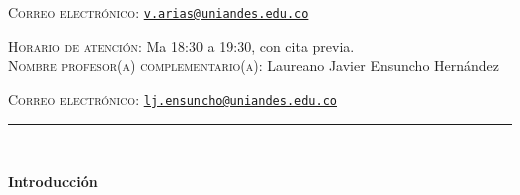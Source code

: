 \documentclass[letterpaper,10pt,onecolumn]{article}
\begin{document}
\noindent\textsc{Correo electr\'onico:}
\href{mailto:v.arias@uniandes.edu.co}{\nolinkurl{v.arias@uniandes.edu.co}}

\noindent\textsc{Horario de atenci\'on:} Ma 18:30 a 19:30, con cita previa. 
\\[-0.1cm]

\noindent\textsc{Nombre profesor(a) complementario(a):} 
Laureano Javier Ensuncho Hern\'andez

\noindent\textsc{Correo electr\'onico:}
\href{mailto: lj.ensuncho@uniandes.edu.co}{\nolinkurl{lj.ensuncho@uniandes.edu.co}}






\noindent\rule{\textwidth}{1pt}\\[-0.1cm]

\addtocounter{mysection}{1}

\noindent\textbf{\large {} \quad Introducci\'on}\\[-0.2cm]

\end{document}
